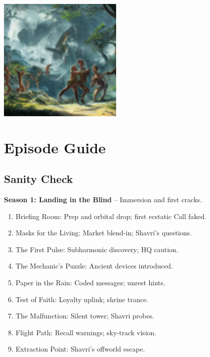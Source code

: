\documentclass[10pt,letterpaper]{article}
\begin{document}
\begin{paracol}{2}
\begin{center}
\includegraphics[width=0.45\textwidth]{characters_image.jpg} %
\end{center}

\switchcolumn

\section{Episode Guide}
\subsection{Sanity Check}
\textbf{Season 1: Landing in the Blind} – Immersion and first cracks.
\begin{enumerate}[leftmargin=0pt,itemsep=0pt]
    \item Briefing Room: Prep and orbital drop; first ecstatic Call faked.
    \item Masks for the Living: Market blend-in; Shavri's questions.
    \item The First Pulse: Subharmonic discovery; HQ caution.
    \item The Mechanic’s Puzzle: Ancient devices introduced.
    \item Paper in the Rain: Coded messages; unrest hints.
    \item Test of Faith: Loyalty uplink; shrine trance.
    \item The Malfunction: Silent tower; Shavri probes.
    \item Flight Path: Recall warnings; sky-track vision.
    \item Extraction Point: Shavri's offworld escape.
\end{enumerate}


\end{paracol}
\end{document}
